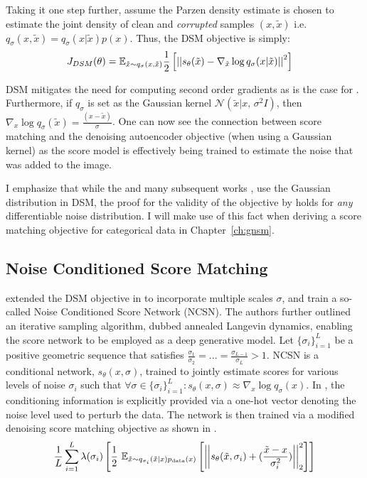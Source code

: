 Taking it one step further, assume the Parzen density estimate is chosen to estimate the joint density of clean and \textit{corrupted} samples $(x, \tilde{x})$ i.e. $q_{\sigma}(x, \tilde{x}) = q_{\sigma}(x | \tilde{x} ) p(x) $. Thus, the DSM objective is simply:
\begin{align}
\label{eq:denoising_sm}
    J_{DSM}(\theta) &= \mathbb{E}_{\tilde{x}\sim q_{\sigma}(x, \tilde{x})} \frac{1}{2} \left[ { \left|\left| {s_\theta(\tilde{x}) - \nabla_{\tilde{x}} \log q_{\sigma}(x | \tilde{x}) } \right|\right|^2 } \right]
\end{align}

DSM mitigates the need for computing second order gradients as is the case for . Furthermore, if $q_{\sigma}$ is set as the Gaussian kernel $\mathcal{N}(\tilde{x} |  x,\,\sigma^{2}I)$, then $\nabla_x \log q_{\sigma}(\tilde{x}) = \frac{(x - \tilde{x})}{\sigma}$. One can now see the connection between score matching and the denoising autoencoder objective (when using a Gaussian kernel) as the score model is effectively being trained to estimate the noise that was added to the image.

I emphasize that while the \cite{vincent2011connection} and many subsequent works \cite{Song2019,song2020improved,song2020score}, use the Gaussian distribution in DSM, the proof for the validity of the objective by \cite{vincent2011connection} holds for \textit{any} differentiable noise distribution.
I will make use of this fact when deriving a score matching objective for categorical data in Chapter~\ref{ch:gnsm}.

\subsection*{Noise Conditioned Score Matching}

\cite{Song2019} extended the DSM objective in  to incorporate multiple scales $\sigma$, and train a so-called Noise Conditioned Score Network (NCSN). The authors further outlined an iterative sampling algorithm, dubbed annealed Langevin dynamics, enabling the score network to be employed as a deep generative model. Let $\{\sigma_i\}_{i=1}^L$ be a positive geometric sequence that satisfies $\frac{\sigma_1}{\sigma_2} = ... = \frac{\sigma_{L-1}}{\sigma_{L}} >  1$. NCSN is a conditional network, $s_{\theta}(x,\sigma)$, trained to jointly estimate scores for various levels of noise $\sigma_i$ such that $\forall \sigma \in \{\sigma_i\}_{i=1}^L: s_{\theta}(x,\sigma) \approx \nabla_x \log q_{\sigma}(x)$. In \cite{Song2019}, the conditioning information is explicitly provided via a one-hot vector denoting the noise level used to perturb the data. The network is then trained via a modified denoising score matching objective as shown in .
\begin{equation}
\label{eq:ncsn_dsm}
\frac{1}{L} \sum_{i=1}^L \lambda(\sigma_i)
\left[ {\frac{1}{2} \displaystyle \text{~} \mathbb{E}_{\tilde{x}\sim q_{\sigma_i} (\tilde{x}|x) p_{\text{data}}(x)} \left[ { \left|\left| { s_{\theta}(\tilde{x}, \sigma_i) + (\frac{\tilde{x} - x}{\sigma_i^2}) } \right|\right|^2_2  } \right] } \right]
\end{equation}

